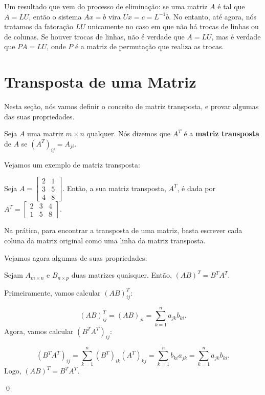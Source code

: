 Um resultado que vem do processo de eliminação: se uma matriz $A$ é tal que $A = LU$, então o sistema $Ax = b$ vira $Ux = c = L^{-1}b$. No entanto, até agora, nós tratamos da fatoração $LU$ unicamente no caso em que não há trocas de linhas ou de colunas. Se houver trocas de linhas, não é verdade que $A = LU$, mas é verdade que $PA = LU$, onde $P$ é a matriz de permutação que realiza as trocas.

\section{Transposta de uma Matriz}

Nesta seção, nós vamos definir o conceito de matriz transposta, e provar algumas das suas propriedades.

\begin{Definition}
	Seja $A$ uma matriz $m\times n$ qualquer. Nós dizemos que $A^T$ é a \textbf{matriz transposta} de $A$ se $(A^T)_{ij} = A_{ji}$.
\end{Definition}

Vejamos um exemplo de matriz transposta:

\begin{Example}
	Seja $A = \begin{bmatrix}
		2 & 1 \\
		3 & 5 \\
		4 & 8
	\end{bmatrix}$. Então, a sua matriz transposta, $A^T$, é dada por $A^T = \begin{bmatrix}
		2 & 3 & 4 \\
		1 & 5 & 8
	\end{bmatrix}$.
\end{Example}

Na prática, para encontrar a transposta de uma matriz, basta escrever cada coluna da matriz original como uma linha da matriz transposta.

Vejamos agora algumas de suas propriedades:

\begin{Proposition}
	Sejam $A_{m\times n}$ e $B_{n\times p}$ duas matrizes quaisquer. Então, $(AB)^T = B^TA^T$.
\end{Proposition}

\begin{Proof}
	Primeiramente, vamos calcular $(AB)^T_{ij}$:
	
	$$
	(AB)^T_{ij} = (AB)_{ji} = \sum\limits_{k = 1}^{n} a_{jk}b_{ki}.
	$$
	Agora, vamos calcular $(B^TA^T)_{ij}$:
	
	$$
	(B^TA^T)_{ij} = \sum\limits_{k = 1}^{n}(B^T)_{ik}(A^T)_{kj} = \sum\limits_{k = 1}^{n} b_{ki}a_{jk} = \sum\limits_{k = 1}^{n} a_{jk}b_{ki}.
	$$
	Logo, $(AB)^T = B^TA^T$.
	
	\qed
\end{Proof}

